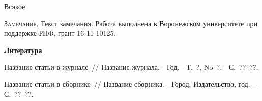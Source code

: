 



%



%
\begin{theorem}
	Всякое
\end{theorem}


%
%
%
%
%



\textsc{Замечание.} Текст замечания.
%
%
%
%
{\small Работа выполнена в Воронежском университете при поддержке РНФ, грант 16-11-10125.}
%
%
%
%

\par\bigskip\centerline{\bf Литература}\smallskip

 \begin{enumerate}

 \itemsep=0pt\parskip=0pt



 {Название статьи в
журнале~/\!/ Название журнала.---Год.---Т.~?, No~?.---С.~??--??.}

{Название статьи в сборнике~/\!/ Название сборника.---Город:
Издательство, год.---С.~??--??.}

 \end{enumerate}





